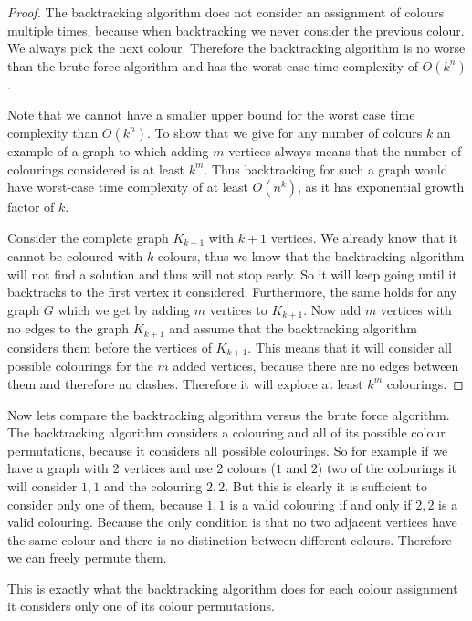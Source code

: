 \documentclass{report}
\theoremstyle{plain}
\theoremstyle{definition}
\theoremstyle{remark}
\numberwithin{definition}{chapter}
\numberwithin{example}{chapter}
\numberwithin{figure}{chapter}
\numberwithin{theorem}{chapter}
\numberwithin{lemma}{chapter}
\begin{document}
\begin{proof}
The backtracking algorithm does not consider an assignment of colours multiple times, because when backtracking we never consider the previous colour. We always pick the next colour. Therefore the backtracking algorithm is no worse than the brute force algorithm and has the worst case time complexity of $O(k^n)$.

Note that we cannot have a smaller upper bound for the worst case time complexity than $O(k^n)$. To show that we give for any number of colours $k$ an example of a graph to which adding $m$ vertices always means that the number of colourings considered is at least $k^m$. Thus backtracking for such a graph would have worst-case time complexity of at least $O(n^k)$, as it has exponential growth factor of $k$.

Consider the complete graph $K_{k+1}$ with $k+1$ vertices. We already know that it cannot be coloured with $k$ colours, thus we know that the backtracking algorithm will not find a solution and thus will not stop early. So it will keep going until it backtracks to the first vertex it considered. Furthermore, the same holds for any graph $G$ which we get by adding $m$ vertices to $K_{k+1}$. Now add $m$ vertices with no edges to the graph $K_{k+1}$ and assume that the backtracking algorithm considers them before the vertices of $K_{k+1}$. This means that it will consider all possible colourings for the $m$ added vertices, because there are no edges between them and therefore no clashes. Therefore it will explore at least $k^m$ colourings.
\end{proof}

Now lets compare the backtracking algorithm versus the brute force algorithm. The backtracking algorithm considers a colouring and all of its possible colour permutations, because it considers all possible colourings. So for example if we have a graph with 2 vertices and use 2 colours ($1$ and $2$) two of the colourings it will consider $1,1$ and the colouring $2,2$. But this is clearly it is sufficient to consider only one of them, because $1,1$ is a valid colouring if and only if $2,2$ is a valid colouring. Because the only condition is that no two adjacent vertices have the same colour and there is no distinction between different colours. Therefore we can freely permute them.

This is exactly what the backtracking algorithm does for each colour assignment it considers only one of its colour permutations.
\end{document}
